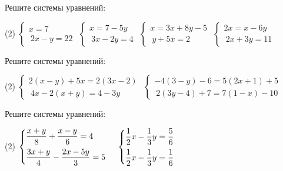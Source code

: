 \begin{consultation}[number=8]
	\begin{listofex}
		\item Решите системы уравнений:
		\begin{tasks}(2)
			\task \( \begin{cases} x=7 \\\ 2x-y=22 \end{cases} \)
			\task \( \begin{cases} x = 7 -5y \\\ 3x-2y=4 \end{cases} \)
			\task \( \begin{cases} x = 3x+8y-5 \\\ y+5x=2 \end{cases} \)
			\task \( \begin{cases} 2x=x-6y \\\ 2x+3y=11 \end{cases} \)
		\end{tasks}
			\item Решите системы уравнений:
			\begin{tasks}(2)
				\task \( \begin{cases} 2(x-y)+5x=2(3x-2) \\\ 4x-2(x+y)=4-3y\end{cases} \)
				\task \( \begin{cases} -4(3-y)-6=5(2x+1)+5 \\\ 2(3y-4)+7=7(1-x)-10\end{cases} \)
			\end{tasks}
			\item Решите системы уравнений:
			\begin{tasks}(2)
				\task \( \begin{cases} \dfrac{x+y}{8}+\dfrac{x-y}{6}=4 \vspace{0,2cm}\\ \dfrac{3x+y}{4}-\dfrac{2x-5y}{3}=5 \end{cases} \)
				\task \( \begin{cases} \dfrac{1}{2}x-\dfrac{1}{3}y=\dfrac{5}{6} \vspace{0,2cm}\\ \dfrac{1}{2}x-\dfrac{1}{3}y=\dfrac{1}{6} \end{cases} \)
			\end{tasks}
	\end{listofex}
\end{consultation}



